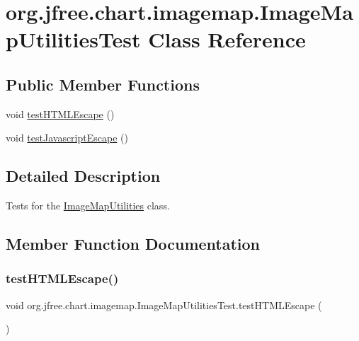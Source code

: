 \hypertarget{classorg_1_1jfree_1_1chart_1_1imagemap_1_1_image_map_utilities_test}{}\section{org.\+jfree.\+chart.\+imagemap.\+Image\+Map\+Utilities\+Test Class Reference}
\label{classorg_1_1jfree_1_1chart_1_1imagemap_1_1_image_map_utilities_test}
\subsection*{Public Member Functions}
\begin{DoxyCompactItemize}
\item 
void \mbox{\hyperlink{classorg_1_1jfree_1_1chart_1_1imagemap_1_1_image_map_utilities_test_ab4b246721d709bcd7a1fde732435af4b}{test\+H\+T\+M\+L\+Escape}} ()
\item 
void \mbox{\hyperlink{classorg_1_1jfree_1_1chart_1_1imagemap_1_1_image_map_utilities_test_adc24f21e076ab489e7e9455566b84e3f}{test\+Javascript\+Escape}} ()
\end{DoxyCompactItemize}


\subsection{Detailed Description}
Tests for the \mbox{\hyperlink{classorg_1_1jfree_1_1chart_1_1imagemap_1_1_image_map_utilities}{Image\+Map\+Utilities}} class. 

\subsection{Member Function Documentation}
\mbox{\label{classorg_1_1jfree_1_1chart_1_1imagemap_1_1_image_map_utilities_test_ab4b246721d709bcd7a1fde732435af4b}} 
\subsubsection{\texorpdfstring{test\+H\+T\+M\+L\+Escape()}{testHTMLEscape()}}
{\footnotesize\ttfamily void org.\+jfree.\+chart.\+imagemap.\+Image\+Map\+Utilities\+Test.\+test\+H\+T\+M\+L\+Escape (\begin{DoxyParamCaption}{ }\end{DoxyParamCaption})}

